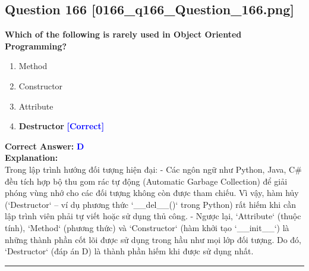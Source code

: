 \documentclass[11pt,a4paper]{article}
\begin{document}
\begin{minipage}{\textwidth}
\subsection*{Question 166 \quad \footnotesize{[0166_q166_Question_166.png]}}
\noindent \textbf{Which of the following is rarely used in Object Oriented Programming?}

\begin{enumerate}[label=\Alph*.]
    \item Method
    \item Constructor
    \item Attribute
    \item \textbf{Destructor} \hfill \textcolor{blue}{\textbf{[Correct]}}
\end{enumerate}

\noindent \textbf{Correct Answer:} \textcolor{blue}{\textbf{D}} \\[4pt]
\noindent \textbf{Explanation:}\\
Trong lập trình hướng đối tượng hiện đại:\newline
- Các ngôn ngữ như Python, Java, C# đều tích hợp bộ thu gom rác tự động (Automatic Garbage Collection) để giải phóng vùng nhớ cho các đối tượng không còn được tham chiếu. Vì vậy, hàm hủy (`Destructor` – ví dụ phương thức `__del__()` trong Python) rất hiếm khi cần lập trình viên phải tự viết hoặc sử dụng thủ công.\newline
- Ngược lại, `Attribute` (thuộc tính), `Method` (phương thức) và `Constructor` (hàm khởi tạo `__init__`) là những thành phần cốt lõi được sử dụng trong hầu như mọi lớp đối tượng.\newline
Do đó, `Destructor` (đáp án D) là thành phần hiếm khi được sử dụng nhất.
\end{minipage}
\vspace{0.8cm}
\hrule
\vspace{0.5cm}
\end{document}
